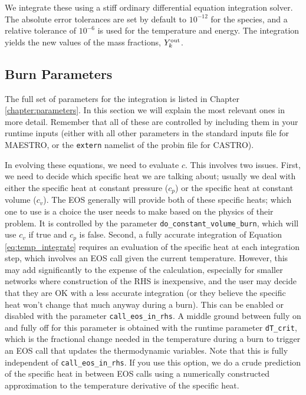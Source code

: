 We integrate these using a stiff ordinary differential equation
integration solver. The absolute error tolerances are set by default
to $10^{-12}$ for the species, and a relative tolerance of $10^{-6}$
is used for the temperature and energy.  The integration
yields the new values of the mass fractions, $Y_k^{\rm out}$.

\subsection{Burn Parameters}

The full set of parameters for the integration is listed in Chapter \ref{chapter:parameters}.
In this section we will explain the most relevant ones in more detail.
Remember that all of these are controlled by including them in your runtime
inputs (either with all other parameters in the standard inputs file for
MAESTRO, or the \texttt{extern} namelist of the probin file for CASTRO).

In evolving these equations, we need to evaluate $c$. This involves two
issues. First, we need to decide which specific heat we are talking about;
usually we deal with either the specific heat at constant pressure ($c_p$)
or the specific heat at constant volume ($c_v$). The EOS generally will
provide both of these specific heats; which one to use is a choice the user
needs to make based on the physics of their problem. It is controlled by the
parameter \texttt{do\_constant\_volume\_burn}, which will use $c_v$ if true
and $c_p$ is false. Second, a fully accurate integration of Equation
\ref{eq:temp_integrate} requires an evaluation of the specific heat at
each integration step, which involves an EOS call given the current temperature.
However, this may add significantly to the expense of the calculation,
especially for smaller networks where construction of the RHS is inexpensive,
and the user may decide that they are OK with a less accurate integration
(or they believe the specific heat won't change that much anyway during a burn).
This can be enabled or disabled with the parameter \texttt{call\_eos\_in\_rhs}.
A middle ground between fully on and fully off for this parameter is obtained
with the runtime parameter \texttt{dT\_crit}, which is the fractional change
needed in the temperature during a burn to trigger an EOS call that updates
the thermodynamic variables. Note that this is fully independent of
\texttt{call\_eos\_in\_rhs}. If you use this option, we do a crude prediction
of the specific heat in between EOS calls using a numerically constructed
approximation to the temperature derivative of the specific heat.

